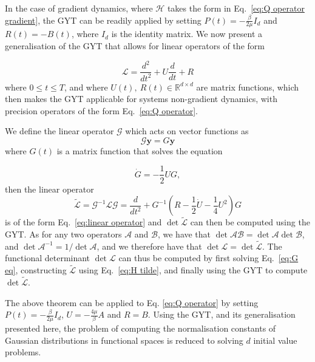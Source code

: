 In the case of gradient dynamics, where $\mathcal{H}$ takes the form
in Eq.~\eqref{eq:Q operator gradient}, the GYT can be readily applied
by setting $P(t)=-\frac{\beta}{2\mu}I_{d}$ and $R(t)=-B(t)$, where
$I_{d}$ is the identity matrix. We now present a generalisation of
the GYT that allows for linear operators of the form

\begin{equation}
\mathcal{L}=\frac{d^{2}}{dt^{2}}+U\frac{d}{dt}+R\label{eq:linear operator with 1st order term}
\end{equation}
where $0\leq t\leq T$, and where $U(t),\ R(t)\in\mathbb{R}^{d\times d}$
are matrix functions, which then makes the GYT applicable for systems
non-gradient dynamics, with precision operators of the form Eq.~\eqref{eq:Q operator}.

We define the linear operator $\mathcal{G}$ which acts on vector
functions as
\[
\mathcal{G}\mathbf{y}=G\mathbf{y}
\]
where $G(t)$ is a matrix function that solves the equation

\begin{equation}
\dot{G}=-\frac{1}{2}UG,\label{eq:G eq}
\end{equation}
then the linear operator
\begin{equation}
\tilde{\mathcal{L}}=\mathcal{G}^{-1}\mathcal{L}\mathcal{G}=\frac{d}{dt^{2}}+G^{-1}\left(R-\frac{1}{2}\dot{U}-\frac{1}{4}U^{2}\right)G\label{eq:H tilde}
\end{equation}
is of the form Eq.~\eqref{eq:linear operator} and $\det\tilde{\mathcal{L}}$
can then be computed using the GYT. As for any two operators $\mathcal{A}$
and $\mathcal{B}$, we have that $\det\mathcal{A\mathcal{B}}=\det\mathcal{A}\det\mathcal{B}$,
and $\det\mathcal{A}^{-1}=1/\det\mathcal{A}$, and we therefore have
that $\det\mathcal{L}=\det\tilde{\mathcal{L}}$. The functional determinant
$\det\mathcal{L}$ can thus be computed by first solving Eq.~\eqref{eq:G eq},
constructing $\tilde{\mathcal{L}}$ using Eq.~\eqref{eq:H tilde},
and finally using the GYT to compute $\det\tilde{\mathcal{L}}$.

The above theorem can be applied to Eq. \eqref{eq:Q operator} by
setting $P(t)=-\frac{\beta}{2\mu}I_{d}$, $U=-\frac{4\mu}{\beta}A$
and $R=B$. Using the GYT, and its generalisation presented here,
the problem of computing the normalisation constants of Gaussian distributions
in functional spaces is reduced to solving $d$ initial value problems.


